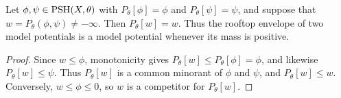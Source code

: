 
\begin{proposition}\label{prop:model-rooftop-fixed-point}
Let $\phi,\psi\in\mathrm{PSH}(X,\theta)$ with $P_\theta[\phi]=\phi$ and $P_\theta[\psi]=\psi$, and suppose that $w=P_\theta(\phi,\psi)\ne-\infty$. Then $P_\theta[w]=w$. Thus the rooftop envelope of two model potentials is a model potential whenever its mass is positive.
\end{proposition}
\begin{proof}
Since $w\leq\phi$, monotonicity gives $P_\theta[w]\leq P_\theta[\phi]=\phi$, and likewise $P_\theta[w]\leq\psi$. Thus $P_\theta[w]$ is a common minorant of $\phi$ and $\psi$, and $P_\theta[w]\leq w$. Conversely, $w\leq\phi\leq0$, so $w$ is a competitor for $P_\theta[w]$.
\end{proof}

